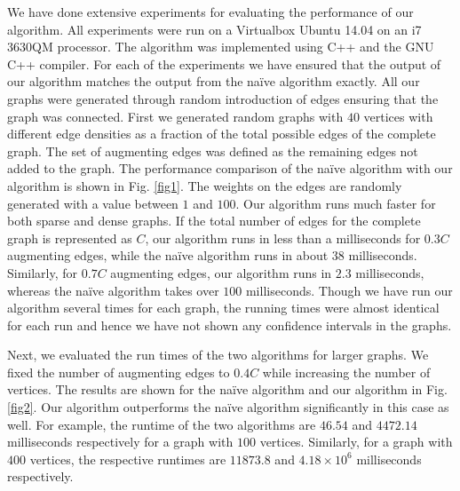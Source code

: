 \documentclass[10pt,letterpaper]{article}
\begin{document}
We have done extensive experiments for evaluating the performance of our algorithm. All experiments 
were run on a Virtualbox Ubuntu 14.04 on an i7 3630QM processor.  The algorithm was implemented using C++ and the GNU C++ compiler. 
For each of the experiments we have ensured that the output of our algorithm matches the output from the 
na\"ive algorithm exactly. 
All our graphs were generated through random introduction 
of edges ensuring that the graph was connected. First we generated random graphs with $40$ vertices 
with different edge densities as a fraction of the total possible edges of the complete graph. The set of augmenting edges was defined as the remaining edges not added to the graph. The 
performance comparison of the na\"ive algorithm with our algorithm is shown in Fig. \ref{fig1}. The weights 
on the edges are randomly generated with a value between $1$ and $100$.
Our algorithm runs much faster for 
both sparse and dense graphs. If the total number of edges for the complete graph is represented as 
$C$, our algorithm runs in less than a milliseconds for $0.3C$ augmenting edges, while the na\"ive algorithm 
runs in about 38 milliseconds. Similarly, for $0.7C$ augmenting edges, our algorithm runs in $2.3$ milliseconds, 
whereas the na\"ive algorithm takes over $100$ milliseconds. Though we have run our algorithm several times for 
each graph, the running times were almost identical for each run and hence we have not shown any confidence intervals 
in the graphs.  

Next, we evaluated the run times of the two algorithms for larger graphs. We fixed the number of augmenting edges to $0.4C$ while increasing the 
number of vertices. The results are shown for the na\"ive algorithm 
and our algorithm in Fig. \ref{fig2}. Our algorithm outperforms 
the na\"ive algorithm significantly in this case as well. For example, the runtime of the two algorithms 
are $46.54$ and $4472.14$ milliseconds respectively for a graph with $100$ vertices. Similarly, for 
a graph with $400$ vertices, the respective runtimes are $11873.8$ and $4.18\times 10^6$ milliseconds 
respectively. 
\end{document}
